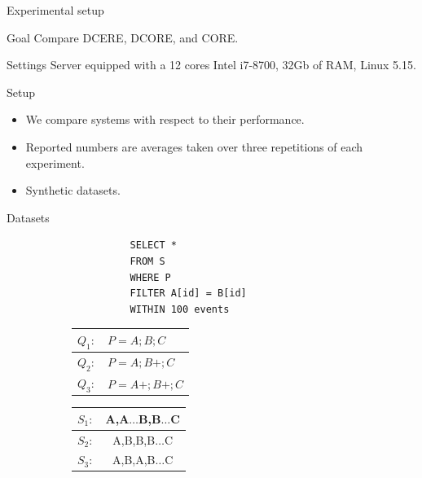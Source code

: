 \documentclass[xcolor=pdftex,dvipsnames,table]{beamer}
\begin{document}
\begin{frame}{Experimental setup}
  \begin{block}{Goal}
    Compare DCERE, DCORE, and CORE.
  \end{block}
  \begin{block}{Settings}
    Server equipped with a 12 cores Intel i7-8700, 32Gb of RAM, Linux 5.15.
  \end{block}
  \begin{block}{Setup}
    \begin{itemize}
      \item We compare systems with respect to their performance.
      \item Reported numbers are averages taken over three repetitions of each experiment.
      \item Synthetic datasets.
    \end{itemize}
  \end{block}
  \begin{block}{Datasets}
    \begin{figure}[H]
      \centering
      \begin{subfigure}[c]{0.32\textwidth}
        \centering
        \begin{verbatim}
          SELECT *
          FROM S
          WHERE P
          FILTER A[id] = B[id]
          WITHIN 100 events
        \end{verbatim}
      \end{subfigure}
      \begin{subfigure}[t]{0.32\textwidth}
        \begin{tabular}{l l}
          \hline
          $Q_{1}:$ & $P = A;B;C$ \\
          \hline
          $Q_{2}:$ & $P = A;B+;C$ \\
          \hline
          $Q_{3}:$ & $P = A+;B+;C$ \\
          \hline
        \end{tabular}
      \end{subfigure}
      \hfill
      \begin{subfigure}[c]{0.32\textwidth}
        \centering
        \begin{tabular}{l c}
          \hline
          $S_{1}:$ & A,A$\ldots$B,B$\ldots$C\\
          \hline
          $S_{2}:$ & A,B,B,B$\ldots$C\\
          \hline
          $S_{3}:$ & A,B,A,B$\ldots$C\\
          \hline
        \end{tabular}
      \end{subfigure}
    \end{figure}
  \end{block}
\end{frame}
\end{document}
